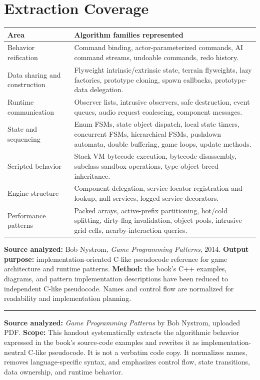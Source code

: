 \documentclass[10pt,letterpaper]{article}
\begin{document}
\section*{Extraction Coverage}
\begin{longtable}{L{0.27\textwidth}L{0.67\textwidth}}
\toprule
\textbf{Area} & \textbf{Algorithm families represented}\\
\midrule
Behavior reification & Command binding, actor-parameterized commands, AI command streams, undoable commands, redo history.\\
Data sharing and construction & Flyweight intrinsic/extrinsic state, terrain flyweights, lazy factories, prototype cloning, spawn callbacks, prototype-data delegation.\\
Runtime communication & Observer lists, intrusive observers, safe destruction, event queues, audio request coalescing, component messages.\\
State and sequencing & Enum FSMs, state object dispatch, local state timers, concurrent FSMs, hierarchical FSMs, pushdown automata, double buffering, game loops, update methods.\\
Scripted behavior & Stack VM bytecode execution, bytecode disassembly, subclass sandbox operations, type-object breed inheritance.\\
Engine structure & Component delegation, service locator registration and lookup, null services, logged service decorators.\\
Performance patterns & Packed arrays, active-prefix partitioning, hot/cold splitting, dirty-flag invalidation, object pools, intrusive grid cells, nearby-interaction queries.\\
\bottomrule
\end{longtable}

\textbf{Source analyzed:} Bob Nystrom, \emph{Game Programming Patterns}, 2014. \textbf{Output purpose:} implementation-oriented C-like pseudocode reference for game architecture and runtime patterns. \textbf{Method:} the book's C++ examples, diagrams, and pattern implementation descriptions have been reduced to independent C-like pseudocode. Names and control flow are normalized for readability and implementation planning.

\medskip\hrule\medskip


\textbf{Source analyzed:} \emph{Game Programming Patterns} by Bob Nystrom, uploaded PDF.
\textbf{Scope:} This handout systematically extracts the algorithmic behavior expressed in the book's source-code examples and rewrites it as implementation-neutral C-like pseudocode. It is not a verbatim code copy. It normalizes names, removes language-specific syntax, and emphasizes control flow, state transitions, data ownership, and runtime behavior.
\end{document}
